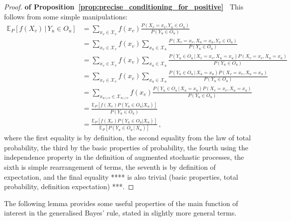\documentclass[twoside,11pt]{article}
\newcommand{\states}{\mathcal{X}}
\begin{document}
\begin{proof}{\bf of Proposition~\ref{prop:precise_conditioning_for_positive}~}
This follows from some simple manipulations:
\begin{align*}
\mathbb{E}_P[f(X_v)\,\vert\,Y_u\in O_u] &= \sum_{x_v\in\states_v} f(x_v)\frac{P(X_v=x_v, Y_u\in O_u)}{P(Y_u\in O_u)} \\
 &= \sum_{x_v\in\states_v} f(x_v)\sum_{x_u\in\states_u}\frac{P(X_v=x_v, X_u=x_u, Y_u\in O_u)}{P(Y_u\in O_u)} \\
 &= \sum_{x_v\in\states_v} f(x_v)\sum_{x_u\in\states_u}\frac{P(Y_u\in O_u\,\vert\,X_v=x_v, X_u=x_u)P(X_v=x_v, X_u=x_u)}{P(Y_u\in O_u)} \\
 &= \sum_{x_v\in\states_v} f(x_v)\sum_{x_u\in\states_u}\frac{P(Y_u\in O_u\,\vert\,X_u=x_u)P(X_v=x_v, X_u=x_u)}{P(Y_u\in O_u)} \\
 &= \sum_{x_{u\cup v}\in\states_{u\cup v}} f(x_v)\frac{P(Y_u\in O_u\,\vert\,X_u=x_u)P(X_v=x_v, X_u=x_u)}{P(Y_u\in O_u)} \\
 &= \frac{\mathbb{E}_P[f(X_v)P(Y_u\in O_u\vert X_u)]}{P(Y_u\in O_u)} \\
 &= \frac{\mathbb{E}_P[f(X_v)P(Y_u\in O_u\vert X_u)]}{\mathbb{E}_P[P(Y_u\in O_u\,\vert\,X_u)]}\,,
\end{align*}
where the first equality is by definition, the second equality from the law of total probability, the third by the basic properties of probability, the fourth using the independence property in the definition of augmented stochastic processes, the sixth is simple rearrangement of terms, the seventh is by definition of expectation, and the final equality **** is also trivial (basic properties, total probability, definition expectation) ***.
\end{proof}

The following lemma provides some useful properties of the main function of interest in the generalised Bayes' rule, stated in slightly more general terms.
\end{document}

